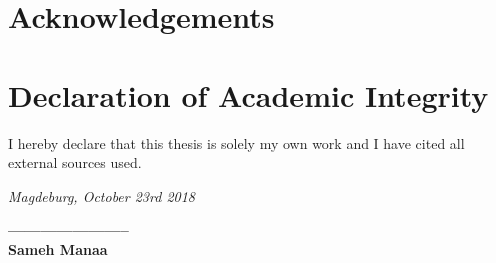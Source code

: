 


{\chapter*{Acknowledgements}}



{\chapter*{Declaration of Academic Integrity}}


I hereby declare that this thesis is solely my own work and I have cited all external sources used.

\textit{Magdeburg, October 23rd 2018} 



\begin{flushright}
\textbf{———————–} \\
\textbf{Sameh Manaa}
\end{flushright}
